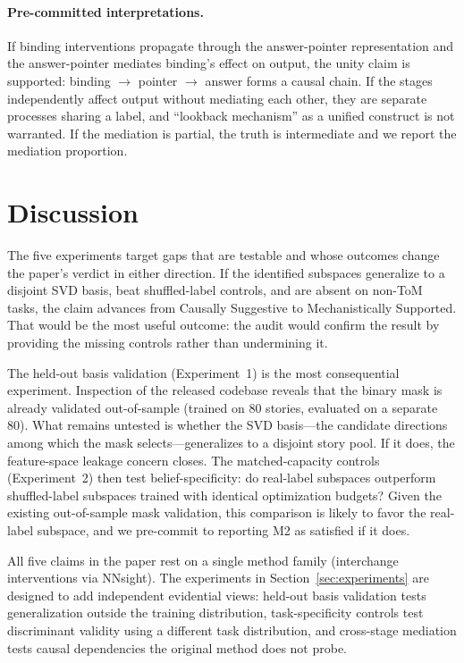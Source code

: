 \documentclass[11pt]{article}
\begin{document}
\paragraph{Pre-committed interpretations.} If binding interventions propagate through the answer-pointer representation and the answer-pointer mediates binding's effect on output, the unity claim is supported: binding $\to$ pointer $\to$ answer forms a causal chain. If the stages independently affect output without mediating each other, they are separate processes sharing a label, and ``lookback mechanism'' as a unified construct is not warranted. If the mediation is partial, the truth is intermediate and we report the mediation proportion.


\section{Discussion}
\label{sec:discussion}

The five experiments target gaps that are testable and whose outcomes change the paper's verdict in either direction. If the identified subspaces generalize to a disjoint SVD basis, beat shuffled-label controls, and are absent on non-ToM tasks, the claim advances from Causally Suggestive to Mechanistically Supported. That would be the most useful outcome: the audit would confirm the result by providing the missing controls rather than undermining it.

The held-out basis validation (Experiment~1) is the most consequential experiment. Inspection of the released codebase reveals that the binary mask is already validated out-of-sample (trained on 80 stories, evaluated on a separate 80). What remains untested is whether the SVD basis---the candidate directions among which the mask selects---generalizes to a disjoint story pool. If it does, the feature-space leakage concern closes. The matched-capacity controls (Experiment~2) then test belief-specificity: do real-label subspaces outperform shuffled-label subspaces trained with identical optimization budgets? Given the existing out-of-sample mask validation, this comparison is likely to favor the real-label subspace, and we pre-commit to reporting M2 as satisfied if it does.

All five claims in the paper rest on a single method family (interchange interventions via NNsight). The experiments in Section~\ref{sec:experiments} are designed to add independent evidential views: held-out basis validation tests generalization outside the training distribution, task-specificity controls test discriminant validity using a different task distribution, and cross-stage mediation tests causal dependencies the original method does not probe.
\end{document}
